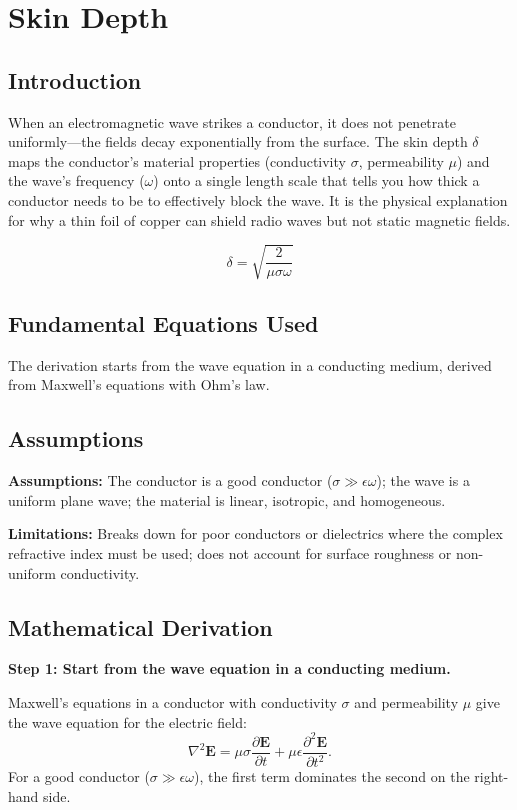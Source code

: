\chapter{Skin Depth}

\section*{Introduction}

When an electromagnetic wave strikes a conductor, it does not penetrate uniformly---the fields decay exponentially from the surface. The skin depth $\delta$ maps the conductor's material properties (conductivity $\sigma$, permeability $\mu$) and the wave's frequency ($\omega$) onto a single length scale that tells you how thick a conductor needs to be to effectively block the wave. It is the physical explanation for why a thin foil of copper can shield radio waves but not static magnetic fields.


\begin{equation}
\delta = \sqrt{\frac{2}{\mu\sigma\omega}}
\end{equation}

\section*{Fundamental Equations Used}

The derivation starts from the wave equation in a conducting medium, derived from Maxwell's equations with Ohm's law.

\section*{Assumptions}

\textbf{Assumptions:} The conductor is a good conductor ($\sigma \gg \epsilon\omega$); the wave is a uniform plane wave; the material is linear, isotropic, and homogeneous.


\textbf{Limitations:} Breaks down for poor conductors or dielectrics where the complex refractive index must be used; does not account for surface roughness or non-uniform conductivity.


\section*{Mathematical Derivation}

\textbf{Step 1: Start from the wave equation in a conducting medium.}

Maxwell's equations in a conductor with conductivity $\sigma$ and permeability $\mu$ give the wave equation for the electric field:
\begin{equation}
\nabla^2\mathbf{E} = \mu\sigma\frac{\partial\mathbf{E}}{\partial t} + \mu\epsilon\frac{\partial^2\mathbf{E}}{\partial t^2}.
\end{equation}
For a good conductor ($\sigma \gg \epsilon\omega$), the first term dominates the second on the right-hand side.

